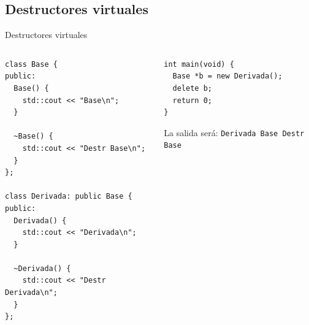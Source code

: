 \subsection{Destructores virtuales}
\begin{frame}{Destructores virtuales}{}
   \begin{columns}[t]
      \begin{column}{.5\linewidth}
         \begin{lstlisting}[style=normal,firstnumber=1]
class Base {
public:
  Base() {
    std::cout << "Base\n";
  }

  ~Base() {
    std::cout << "Destr Base\n";
  }
};

class Derivada: public Base {
public:
  Derivada() {
    std::cout << "Derivada\n";
  }

  ~Derivada() {
    std::cout << "Destr Derivada\n";
  }
};

         \end{lstlisting}
      \end{column}
      \begin{column}{.5\linewidth}
         \begin{lstlisting}[style=normal,firstnumber=23,linebackgroundcolor={%
                 \btLstHLR<1>{25}%
         }]
int main(void) { 
  Base *b = new Derivada();
  delete b;
  return 0;
}
         \end{lstlisting}

La salida ser\'a: \texttt{\newline Derivada \newline Base \newline Destr Base}

      \end{column}
   \end{columns}
\end{frame}

